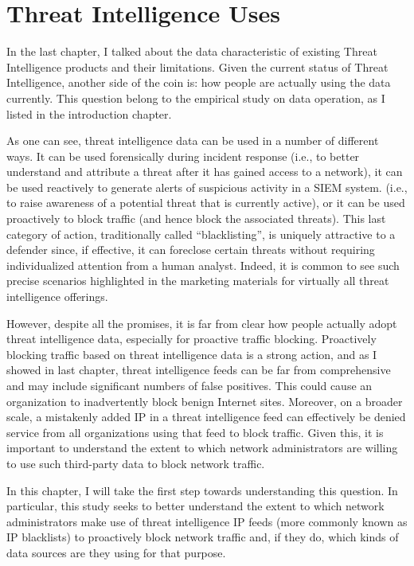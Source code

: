 \chapter{Threat Intelligence Uses}
\label{chapter:data_usage}

In the last chapter, I talked about the data characteristic of 
existing Threat Intelligence products and their limitations. Given
the current status of Threat Intelligence, another side of the coin is:
how people are actually using the data currently. This question belong 
to the empirical study on data operation, as I listed in the 
introduction chapter.

As one can see, threat intelligence data can be used in a number
of different ways. It can be used forensically during incident response
(i.e., to better understand and attribute a threat after it has gained
access to a network), it can be used reactively to generate alerts
of suspicious activity in a SIEM system. 
(i.e., to raise awareness of a potential threat
that is currently active), or it can be used proactively to block
traffic (and hence block the associated threats). This last category
of action, traditionally called ``blacklisting'', is uniquely
attractive to a defender since, if effective, it can foreclose certain
threats without requiring individualized attention from a human
analyst. Indeed, it is common to see such precise scenarios
highlighted in the marketing materials for virtually all threat
intelligence offerings.

However, despite all the promises, it is far from clear how people 
actually adopt threat intelligence data, especially for proactive
traffic blocking. Proactively blocking traffic based on threat 
intelligence data is a strong action, and as I showed in last chapter,
threat intelligence feeds can be far from comprehensive and may include
significant numbers of false positives. This could cause an organization
to inadvertently block benign Internet sites. Moreover, on a broader 
scale, a mistakenly added IP in a threat intelligence feed can
effectively be denied service from all organizations using that feed
to block traffic. Given this, it is important to understand the extent
to which network administrators are willing to use such third-party data 
to block network traffic.

In this chapter, I will take the first step towards understanding this
question. In particular, this study seeks to better understand the extent 
to which network administrators make use of threat intelligence IP feeds
(more commonly known as IP blacklists) to proactively block network 
traffic and, if they do, which kinds of data sources are they using for 
that purpose.

